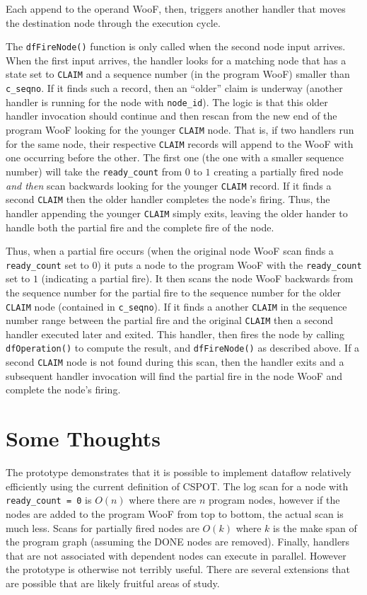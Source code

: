 \documentclass[10pt]{article}
\begin{document}
Each append to the operand WooF, then, triggers another handler that moves the
destination node through the execution cycle.

The \verb+dfFireNode()+ function is only called when the second node input
arrives.  When the first input arrives, the handler looks for a matching node
that has a state set to \verb+CLAIM+ and a sequence number (in the program
WooF) smaller than \verb+c_seqno+.  If it finds such a record, then an
``older'' claim is underway (another handler is running for the node with
\verb+node_id+).  The logic is that this older handler invocation should
continue and then rescan from the new end of the program WooF looking for the
younger \verb+CLAIM+ node.  That is, if two handlers run for the same node,
their respective \verb+CLAIM+ records will append to the WooF with one
occurring before the other.  The first one (the one with a smaller sequence
number) will take the \verb+ready_count+ from $0$ to $1$ creating a partially
fired node \textit{and then} scan backwards looking for the younger
\verb+CLAIM+ record.  If it finds a second \verb+CLAIM+ then the older handler
completes the node's firing.  Thus, the handler appending the younger
\verb+CLAIM+ simply exits, leaving the older hander to handle both the partial
fire and the complete fire of the node.

Thus, when a partial fire occurs (when the original node WooF scan finds a
\verb+ready_count+ set to $0$) it puts a node to the program WooF with the
\verb+ready_count+ set to $1$ (indicating a partial fire).  It then scans
the node WooF backwards from the sequence number for the partial fire to the
sequence number for the older \verb+CLAIM+ node (contained in \verb+c_seqno+).
If it finds a another \verb+CLAIM+ in the sequence number range between the
partial fire and the original \verb+CLAIM+ then a second handler executed later
and exited.  This handler, then fires the node by calling \verb+dfOperation()+
to compute the result, and \verb+dfFireNode()+ as described above.  If a second
\verb+CLAIM+ node is not found during this scan, then the handler exits and a
subsequent handler invocation will find the partial fire in the node WooF and
complete the node's firing.

\section{Some Thoughts}

The prototype demonstrates that it is possible to implement dataflow
relatively efficiently using the current definition of CSPOT.  The log scan
for a node with \verb+ready_count = 0+ is $O(n)$ where there are $n$ program
nodes, however if the nodes are added to the program WooF from top to bottom,
the actual scan is much less.  Scans for partially fired nodes are $O(k)$
where $k$ is the make span of the program graph (assuming the DONE nodes are
removed).  Finally, handlers that are
not associated with dependent nodes can execute in parallel.
However the prototype is otherwise not terribly useful.  There are
several extensions that are possible that are likely fruitful areas of study.
\end{document}
